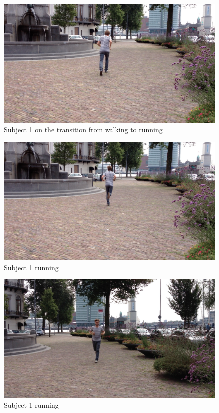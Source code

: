 
\begin{figure}
\centering
  \includegraphics[width=1\textwidth]{./Figures/chapter6/data_collection/stills/jos_cp_walk-run.png}
  \caption[Recording still 1]{Subject 1 on the transition from walking to running}
\end{figure}

\begin{figure}
\centering
  \includegraphics[width=1\textwidth]{./Figures/chapter6/data_collection/stills/jos_run_2.png}
  \caption[Recording still 2]{Subject 1 running}
\end{figure}

\begin{figure}
\centering
  \includegraphics[width=1\textwidth]{./Figures/chapter6/data_collection/stills/jos_run.png}
  \caption[Recording still 3]{Subject 1 running}
\end{figure}

